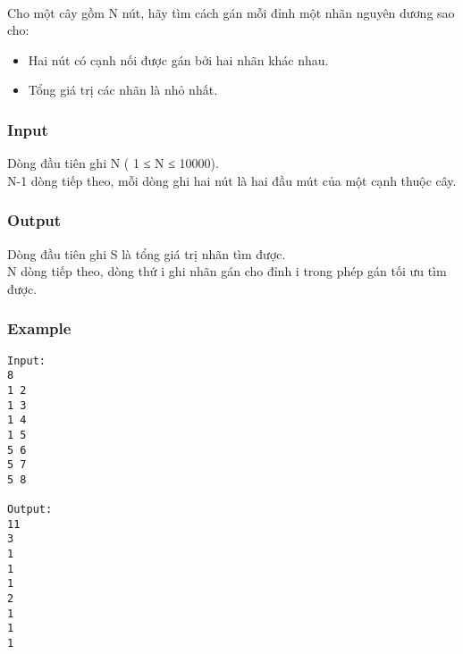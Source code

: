 

 

Cho một cây gồm N nút, hãy tìm cách gán mỗi đỉnh một nhãn nguyên dương sao cho:
\begin{itemize}
	\item Hai nút có cạnh nối được gán bởi hai nhãn khác nhau.
	\item Tổng giá trị các nhãn là nhỏ nhất.
\end{itemize}

\subsubsection{Input}

Dòng đầu tiên ghi N ( 1 ≤ N ≤ 10000).
\\N-1 dòng tiếp theo, mỗi dòng ghi hai nút là hai đầu mút của một cạnh thuộc cây.

\subsubsection{Output}

Dòng đầu tiên ghi S là tổng giá trị nhãn tìm được.
\\N dòng tiếp theo, dòng thứ i ghi nhãn gán cho đỉnh i trong phép gán tối ưu tìm được.

\subsubsection{Example}
\begin{verbatim}
Input:
8
1 2
1 3
1 4
1 5
5 6
5 7
5 8

Output:
11
3
1
1
1
2
1
1
1

\end{verbatim}